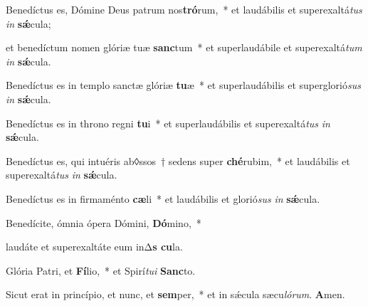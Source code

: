 \item Benedíctus es, Dómine Deus patrum nos\textbf{tró}rum,~* et laudábilis et superexaltá\textit{tus} \textit{in} \textbf{sǽ}cula;

\item et benedíctum nomen glóriæ tuæ \textbf{sanc}tum~* et superlaudábile et superexaltá\textit{tum} \textit{in} \textbf{sǽ}cula.

\item Benedíctus es in templo sanctæ glóriæ \textbf{tu}æ~* et superlaudábilis et superglorió\textit{sus} \textit{in} \textbf{sǽ}cula.

\item Benedíctus es in throno regni \textbf{tu}i~* et superlaudábilis et superexaltá\textit{tus} \textit{in} \textbf{sǽ}cula.

\item Benedíctus es, qui intuéris ab◊ssos~† sedens super \textbf{ché}rubim,~* et laudábilis et superexaltá\textit{tus} \textit{in} \textbf{sǽ}cula.

\item Benedíctus es in firmaménto \textbf{cæ}li~* et laudábilis et glorió\textit{sus} \textit{in} \textbf{sǽ}cula.

\item Benedícite, ómnia ópera Dómini, \textbf{Dó}mino,~*

\item laudáte et superexaltáte eum inΔ\textbf{s cu}la.

\item Glória Patri, et \textbf{Fí}lio,~* et Spirí\textit{tu}\textit{i} \textbf{Sanc}to.

\item Sicut erat in princípio, et nunc, et \textbf{sem}per,~* et in sǽcula sæcu\textit{ló}\textit{rum}. \textbf{A}men.

